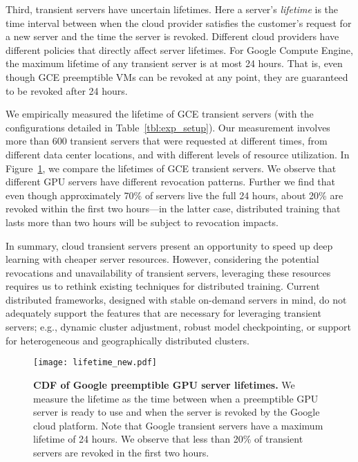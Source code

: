 Third, transient servers have uncertain lifetimes. Here a server's
\emph{lifetime} is
the time interval  between when the cloud provider satisfies the customer's
request for a new server and the time the server is revoked. Different cloud
providers have different policies that directly affect server lifetimes. For
Google Compute Engine, the maximum lifetime of any transient server is at  most
24 hours. That is, even though GCE preemptible VMs can be revoked at any point, 
they are guaranteed to be revoked after 24 hours. 

We empirically measured the lifetime of GCE transient servers (with the
configurations detailed in Table~\ref{tbl:exp_setup}). Our measurement involves 
more than 600 transient servers that were requested at different times, from 
different data center locations, and with different levels of resource utilization. 
In Figure~\ref{design:gpu_lifetime}, we compare the lifetimes of GCE transient 
servers. We observe that different GPU servers have different revocation
patterns. Further we find that 
even though approximately 70\% of servers live the full 24 hours, about 20\% are revoked 
within the first two hours---in the latter case, distributed training that lasts more than two hours 
will be subject to revocation impacts. 


In summary, cloud transient servers present an opportunity to speed up deep
learning with cheaper server resources.  However, considering the potential
revocations and unavailability of transient servers, leveraging these resources
requires us to rethink existing techniques for distributed training.  Current
distributed frameworks, designed with stable on-demand servers in mind, do not
adequately support the features that are necessary for leveraging transient
servers; e.g., dynamic cluster adjustment, robust model checkpointing, 
or support for heterogeneous and geographically distributed clusters. 


    
 \begin{figure}[t]
\centering
    \texttt{[image: lifetime\_new.pdf]}
\caption{\textbf{CDF of Google preemptible GPU server lifetimes.} We measure
   the lifetime as the time between when a preemptible GPU server is ready
   to use and when the server is revoked by the Google cloud
   platform. Note that Google transient servers have a maximum lifetime of 24
   hours. We observe that less than 20\% of transient servers are revoked in
   the first two hours.}
    \label{design:gpu_lifetime}
\end{figure}
